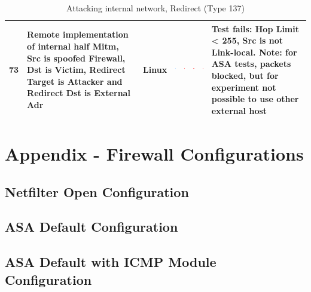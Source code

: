 \documentclass[12pt]{article}
\begin{document}
\begin{savenotes}
\begin{table}[!h]
{{\begin{tabular}{|C{1.0cm}|L{6.0cm}|C{1.5cm}|C{1.0cm}|C{1.0cm}|C{1.0cm}|C{1.0cm}|L{7.0cm}|}
73&Remote implementation of internal half Mitm, Src is spoofed Firewall, Dst is Victim, Redirect Target is Attacker and Redirect Dst is External Adr&Linux&\includegraphics[width=4mm, height=4mm]{ok}&\includegraphics[width=4mm, height=4mm]{notok}&\includegraphics[width=4mm, height=4mm]{notok}&\includegraphics[width=4mm, height=4mm]{notok}&Test fails: Hop Limit < 255, Src is not Link-local. Note: for ASA tests, packets blocked, but for experiment not possible to use other external host\\
\hline
\end{tabular}}}
\caption{Attacking internal network, Redirect (Type 137)}
\label{table:attackInternalResults12}
\end{table}
\end{savenotes}

\clearpage

\pagebreak

\section{Appendix - Firewall Configurations}
\label{Appendix 5}

\subsection{Netfilter Open Configuration}
\label{appendix:netfilterOpenApp}



\subsection{ASA Default Configuration}
\label{appendix:ASAdefaultAppendix}




\subsection{ASA Default with ICMP Module Configuration}
\label{appendix:ASAicmpAppendix}
\end{document}
